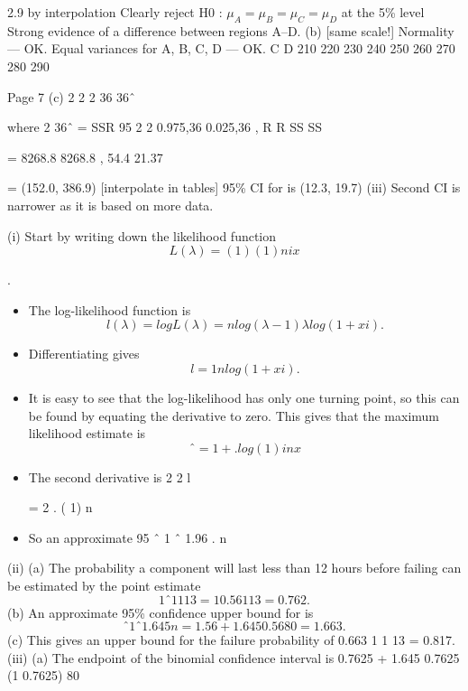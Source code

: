 \documentclass[a4paper,12pt]{article}
\begin{document}
2.9 by interpolation
Clearly reject H0 : $\mu_A = \mu_B = \mu_C = \mu_D$ at the 5\% level
 Strong evidence of a difference between regions A–D.
(b)
[same scale!]
Normality — OK.
Equal variances for A, B, C, D — OK.
 C
D
210 220 230 240 250 260 270 280 290

Page 7
(c)
2
2
2 36
36ˆ
~



where 2 36ˆ = SSR
 95%
2 2
0.975,36 0.025,36
,
R R  SS SS 

=
8268.8 8268.8
,
54.4 21.37
 

= (152.0, 386.9) [interpolate in tables]
 95\% CI for  is (12.3, 19.7)
(iii) Second CI is narrower as it is based on more data.



\item (i) Start by writing down the likelihood function
\[L(\lambda) =
( 1)
(1 )
n
i x\]

 
 
.
\begin{itemize}
    \item The log-likelihood function is
\[l(\lambda) = log L(\lambda) = n log(\lambda -1)  \lambda log(1 + xi).\]
\item Differentiating gives
\[l

=
1
n
 
 log(1 + xi).\]
\item It is easy to see that the log-likelihood has only one turning point, so this
can be found by equating the derivative to zero. This gives that the
maximum likelihood estimate is
\[ˆ
= 1 + .
log(1 ) i
n
  x\]
\item The second derivative is
2
2
 l

= 2 .
( 1)
n
 
\item So an approximate 95%
ˆ 1
ˆ 1.96 .
n
 
\end{itemize}

 

(ii) (a) The probability a component will last less than 12 hours before
failing can be estimated by the point estimate
\[1  ˆ 1
1
13
= 1  0.56
1
13
= 0.762.\]
(b) An approximate 95\% confidence upper bound for  is
\[ ˆ 1
ˆ 1.645
n
 
  = 1.56 + 1.645
0.56
80
= 1.663.\]
(c) This gives an upper bound for the failure probability of
0.663
1
1
13
 = 0.817.
(iii) (a) The endpoint of the binomial confidence interval is
0.7625 + 1.645 
0.7625 (1 0.7625)
80
 
\end{document}
